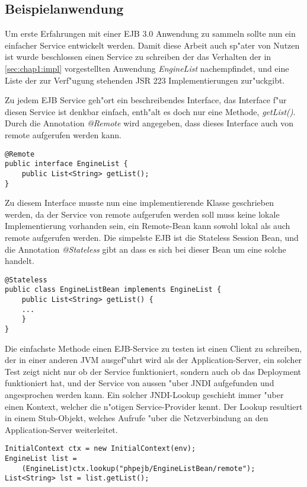 \subsection{Beispielanwendung}
\label{sec:chap2:infra:example}

Um erste Erfahrungen mit einer EJB 3.0 Anwendung zu sammeln sollte nun ein einfacher Service entwickelt werden.
Damit diese Arbeit auch sp"ater von Nutzen ist wurde beschlossen einen Service zu schreiben der das Verhalten
der in \ref{sec:chap1:impl} vorgestellten Anwendung \emph{EngineList} nachempfindet, und eine Liste der zur Verf"ugung 
stehenden JSR 223 Implementierungen zur"uckgibt.

Zu jedem EJB Service geh"ort ein beschreibendes Interface, das Interface f"ur diesen Service ist denkbar einfach,
enth"alt es doch nur eine Methode, \emph{getList()}. Durch die Annotation \emph{@Remote} wird angegeben, dass dieses
Interface auch von remote aufgerufen werden kann.
\begin{lstlisting}[caption=Testservice Interface]
@Remote
public interface EngineList {
    public List<String> getList();
}
\end{lstlisting}
Zu diesem Interface musste nun eine implementierende Klasse geschrieben werden, da der Service von remote aufgerufen
werden soll muss keine lokale Implementierung vorhanden sein, ein Remote-Bean kann sowohl lokal als auch remote
aufgerufen werden. Die simpelste EJB ist die Stateless Session Bean, und die Annotation \emph{@Stateless} gibt an
dass es sich bei dieser Bean um eine solche handelt.
\begin{lstlisting}[caption=Testservice Bean]
@Stateless
public class EngineListBean implements EngineList {
    public List<String> getList() {
    ...
    }
}
\end{lstlisting}
Die einfachste Methode einen EJB-Service zu testen ist einen Client zu schreiben, der in einer anderen JVM
ausgef"uhrt wird als der Application-Server, ein solcher Test zeigt nicht nur ob der Service funktioniert,
sondern auch ob das Deployment funktioniert hat, und der Service von aussen "uber JNDI aufgefunden und angesprochen
werden kann. Ein solcher JNDI-Lookup geschieht immer "uber einen Kontext, welcher die n"otigen Service-Provider
kennt. Der Lookup resultiert in einem Stub-Objekt, welches Aufrufe "uber die Netzverbindung an den Application-Server
weiterleitet.
\begin{lstlisting}[caption=Testservice Client]
InitialContext ctx = new InitialContext(env);
EngineList list = 
    (EngineList)ctx.lookup("phpejb/EngineListBean/remote");
List<String> lst = list.getList();
\end{lstlisting}

